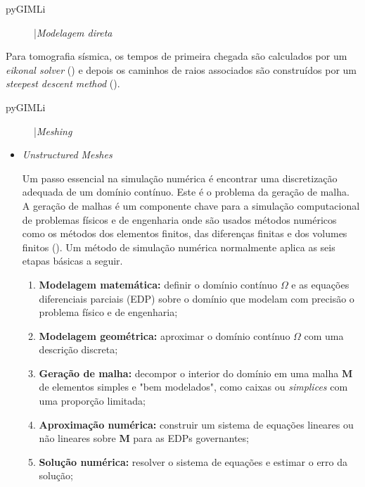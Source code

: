 \documentclass[a4paper, 12 pt]{article} %
\begin{document}
\begin{description}
	\item[pyGIMLi] |\textit{Modelagem direta} 
\end{description}

Para tomografia sísmica, os tempos de primeira chegada são calculados por um \textit{eikonal solver} (\citealp{podvin1991finite}) e depois os caminhos de raios associados são construídos por um \textit{steepest descent method} (\citealp{aldridge1993two}).

\begin{description}
	\item[pyGIMLi] |\textit{Meshing} 
\end{description}

\begin{itemize}
	\item \textit{Unstructured Meshes}
	
	\hspace{0.5cm} Um passo essencial na simulação numérica é encontrar uma discretização adequada de um domínio contínuo. Este é o problema da geração de malha. A geração de malhas é um componente chave para a simulação computacional de problemas físicos e de engenharia onde são usados métodos numéricos como os métodos dos elementos finitos, das diferenças finitas e dos volumes finitos (\citealp{teng2000unstructured}). Um método de simulação numérica normalmente aplica as seis etapas básicas a seguir.
	
	\begin{enumerate}
		\item \textbf{Modelagem matemática:} definir o domínio contínuo \textbf{$\Omega$} e as equações diferenciais parciais (EDP) sobre o domínio que modelam com precisão o problema físico e de engenharia;
		
		\item \textbf{Modelagem geométrica:} aproximar o domínio contínuo \textbf{$\Omega$} com uma descrição discreta;
		
		\item \textbf{Geração de malha:} decompor o interior do domínio em uma malha $\textbf{M}$ de elementos simples e "bem modelados", como caixas ou \textit{simplices} com uma proporção limitada;
		
		\item \textbf{Aproximação numérica:} construir um sistema de equações lineares ou não lineares sobre $\textbf{M}$ para as EDPs governantes;
		
		\item \textbf{Solução numérica:} resolver o sistema de equações e estimar o erro da solução;
		

\end{enumerate}
\end{itemize}
\end{document}
